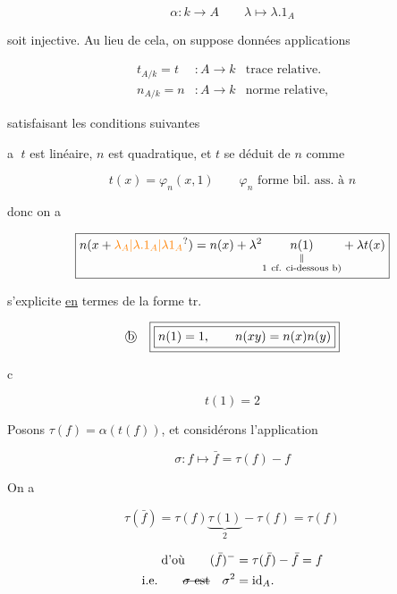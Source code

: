 \[
\alpha:k\longrightarrow A\qquad\lambda\longmapsto\lambda.1_A
\]

soit injective. Au lieu de cela, on suppose données  applications

\[
\begin{aligned}
t_{A/k}=t &: A\longrightarrow k &\text{trace relative.}\\
n_{A/k}=n &: A\longrightarrow k &\text{norme relative,}
\end{aligned}
\]

satisfaisant les conditions suivantes

\textcircled{a} $t$ est linéaire, $n$ est quadratique, et $t$ se déduit de $n$ comme

\[
t(x)=\varphi_n(x,1)\qquad\text{$\varphi_n$ forme bil. ass. à $n$}
\]

donc on a 

\[
\boxed{n(x+\unsure{\lambda_A|\lambda.1_A|\lambda1_A})=n(x)+\lambda^2\underset{\substack{\Vert\\1\ \text{cf. ci-dessous b)}}}{n(1)}+\lambda t(x)}
\]



  s'explicite \uline{en} termes de  la forme tr.

\[
\text{\textcircled{b}}\quad\boxed{\boxed{n(1)=1,\qquad n(xy)=n(x)n(y)}}
\]


\textcircled{c}  

\[
\boxed{t(1)=2}
\]

Posons $\tau(f)=\alpha(t(f))$, et considérons l'application

\[
\sigma:f\longmapsto\bar f=\tau(f)-f
\]

 On a

\[
\tau(\bar f)=\tau(f)\underbrace{\tau(1)}_{2}-\tau(f)=\tau(f)
\]

\[
\begin{aligned}
\text{d'où}\qquad(\bar f)^{-}&=\tau(\bar f)-\bar f=f\\
\text{i.e.}\qquad\deleted{\sigma\ \mathrm{est}}\quad\sigma^2&=\mathrm{id}_A.
\end{aligned}
\]

